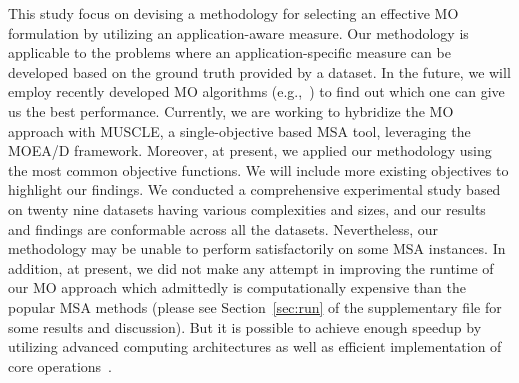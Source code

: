 This study focus on devising a methodology for selecting an effective MO formulation by utilizing an application-aware measure.  Our methodology is applicable to the problems where an application-specific measure can be developed based on the ground truth provided by a dataset. In the future, we will employ recently developed MO algorithms (e.g.,~\cite{8981871, 9047876, 9097242}) to find out which one can give us the best performance. Currently, we are working to hybridize the MO approach with MUSCLE, a single-objective based MSA tool, leveraging the MOEA/D framework. Moreover, at present, we applied our methodology using the most common objective functions. We will include more existing objectives to highlight our findings. We conducted a comprehensive experimental study based on twenty nine datasets having various complexities and sizes, and our results and findings are conformable across all the datasets. Nevertheless, our methodology may be unable to perform satisfactorily on some MSA instances. In addition, at present, we did not make any attempt in improving the runtime of our MO approach which admittedly is computationally expensive than the popular MSA methods (please see Section~\ref{sec:run} of the supplementary file for some results and discussion). But it is possible to achieve enough speedup by utilizing advanced computing architectures as well as efficient implementation of core operations~\cite{8255834, 7738460}.  



